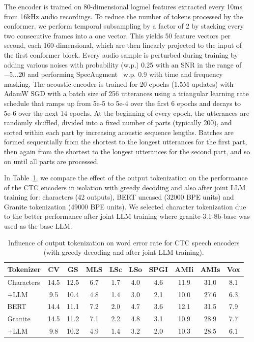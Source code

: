 \documentclass[9pt,conference]{IEEEtran}
\begin{document}
The encoder is trained on 80-dimensional logmel features extracted every 10ms from 16kHz audio recordings. 
To reduce the number of tokens processed by the conformer, we perform temporal subsampling by a factor of 2 by stacking every two consecutive frames into a one vector. This yields 50 feature vectors per second, each 160-dimensional, which are then linearly projected to the input of the first conformer block.
Every audio sample is perturbed during training by adding various noises with probability (w.p.) 0.25 with an SNR in the range of $-5\ldots 20$ and performing SpecAugment~\cite{park19} w.p. 0.9 with time and frequency masking. The acoustic encoder is trained for 20 epochs (1.5M updates) with AdamW SGD with a batch size of 256 utterances using a triangular learning rate schedule that ramps up from 5e-5 to 5e-4 over the first 6 epochs and decays to 5e-6 over the next 14 epochs. At the beginning of every epoch, the utterances are randomly shuffled, divided into a fixed number of parts (typically 200), and sorted within each part by increasing acoustic sequence lengths. Batches are formed sequentially from the shortest to the longest utterances for the first part, then again from the shortest to the longest utterances for the second part, and so on until all parts are processed.

In Table~\ref{tok}, we compare the effect of the output tokenization on the performance of the CTC encoders in isolation with greedy decoding and also after joint LLM training for: characters (42 outputs), BERT uncased (32000 BPE units) and Granite tokenization (49000 BPE units). We selected character tokenization due to the better performance after joint LLM training where granite-3.1-8b-base was used as the base LLM.

\begin{table}[htb]
\begin{center}
\begin{tabular}{|l|c|c|c|c|c|c|c|c|c|}\hline
Tokenizer   &  CV  & GS & MLS & LSc & LSo & SPGI & AMIi & AMIs & Vox\\ \hline
Characters    & 14.5 & 12.5 & 6.7  & 1.7   & 4.0   & 4.6  & 11.9    & 31.0    & 8.1\\ 
+LLM     & 9.5  & 10.4 & 4.8  & 1.4   & 3.0   & 2.1  & 10.0    & 27.6    & 6.3\\ \hline
BERT     & 14.4 & 11.1       & 7.2  & 2.0   & 4.7   & 3.6  & 12.1    & 31.5    & 7.9 \\ \hline
Granite  & 14.5 & 11.2       & 7.1  & 2.2   & 4.8   & 3.1  & 10.9    & 28.9    & 7.7 \\ 
+LLM     & 9.8  & 10.2 & 4.9 & 1.4  & 3.2   & 2.0  & 10.3  & 28.5    & 6.1\\ \hline
\end{tabular}
\end{center}
\caption{\label{tok} Influence of output tokenization on word error rate for CTC speech encoders (with greedy decoding and after joint LLM training).}
\end{table}
\end{document}

